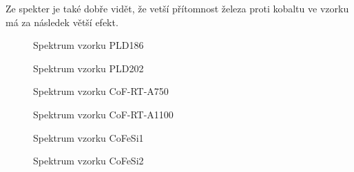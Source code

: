 Ze spekter je také dobře vidět, že vetší přítomnost železa proti kobaltu ve vzorku má za následek větší efekt.



\begin{figure}

\caption{Spektrum vzorku PLD186}
\label{sPLD189}
\end{figure}

\begin{figure}

\caption{Spektrum vzorku PLD202}
\label{sPLD202}
\end{figure}

\begin{figure}

\caption{Spektrum vzorku CoF-RT-A750}
\label{sCoF-RT-A750}
\end{figure}

\begin{figure}

\caption{Spektrum vzorku CoF-RT-A1100}
\label{sCoF-RT-A1100}
\end{figure}

\begin{figure}

\caption{Spektrum vzorku CoFeSi1}
\label{sCoFeSi1}
\end{figure}

\begin{figure}

\caption{Spektrum vzorku CoFeSi2}
\label{sCoFeSi2}
\end{figure}
